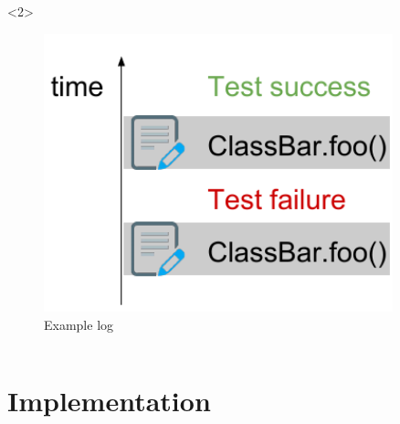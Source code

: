\documentclass[aspectratio=169]{beamer}
\begin{document}
\begin{frame}[fragile]
\begin{columns}
\begin{column}{0.5\textwidth}
\begin{onlyenv}<2>
\begin{figure}
\begin{center}
\includegraphics[width=0.9\textwidth]{img/example_log.pdf}
\end{center}
\caption{Example log}
\end{figure}
\end{onlyenv}

\end{column}

\end{columns}

\end{frame}

\section{Implementation}
\end{document}
